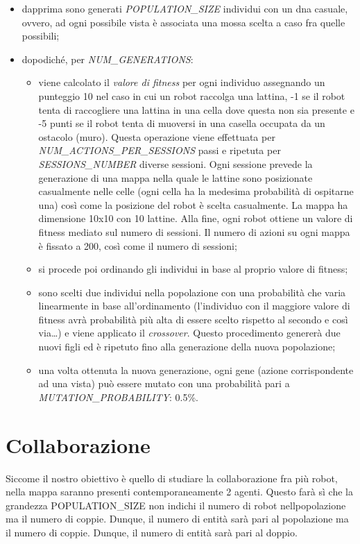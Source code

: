 \begin{itemize}
	\item dapprima sono generati \textit{POPULATION\_SIZE} individui con un dna
	casuale, ovvero, ad ogni possibile vista è associata una mossa scelta a caso
	fra quelle possibili;
	\item dopodiché, per \textit{NUM\_GENERATIONS}:
	\begin{itemize}
		\item viene calcolato il \textit{valore di fitness} per ogni individuo
		assegnando un punteggio 10 nel caso in cui un robot raccolga una
		lattina, -1 se il robot tenta di raccogliere una lattina in una cella
		dove questa non sia presente e -5 punti se il robot tenta di muoversi in
		una casella occupata da un ostacolo (muro). Questa operazione viene
		effettuata per \textit{NUM\_ACTIONS\_PER\_SESSIONS} passi e ripetuta per
		\textit{SESSIONS\_NUMBER} diverse sessioni. Ogni sessione prevede la
		generazione di una mappa nella quale le lattine sono posizionate
		casualmente nelle celle (ogni cella ha la medesima probabilità di
		ospitarne una) così come la posizione del robot è scelta casualmente.
		La mappa ha dimensione 10x10 con 10 lattine. Alla fine, ogni robot
		ottiene un valore di fitness mediato sul numero di sessioni. Il numero
		di azioni su ogni mappa è fissato a 200, così come il numero di
		sessioni;
		\item si procede poi ordinando gli individui in base al proprio valore
		di fitness;
		\item sono scelti due individui nella popolazione con una probabilità
		che varia linearmente in base all'ordinamento (l'individuo con il
		maggiore valore di fitness avrà probabilità più alta di essere scelto
		rispetto al secondo e così via\dots) e viene applicato il
		\textit{crossover}. Questo procedimento genererà due nuovi figli ed è
		ripetuto fino alla generazione della nuova popolazione;
		\item una volta ottenuta la nuova generazione, ogni gene (azione
		corrispondente ad una vista) può essere mutato con una probabilità pari
		a \textit{MUTATION\_PROBABILITY}: 0.5\%.
	\end{itemize}
\end{itemize}

\section{Collaborazione}
Siccome il nostro obiettivo è quello di studiare la collaborazione fra più
robot, nella mappa saranno presenti contemporaneamente 2 agenti. Questo farà sì
che la grandezza POPULATION\_SIZE non indichi il numero di robot nellpopolazione ma il numero di coppie. Dunque, il numero di entità sarà pari al
popolazione ma il numero di coppie. Dunque, il numero di entità sarà pari al
doppio.

